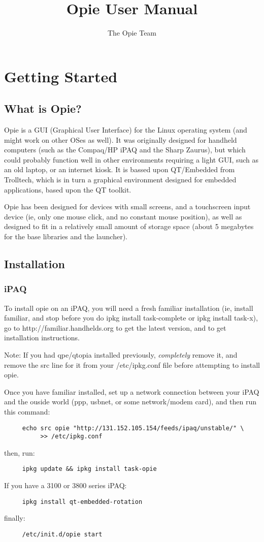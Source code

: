\documentclass[12pt,letterpaper,oneside, openany]{book} \usepackage[latin1] {inputenc}
\title{Opie User Manual}
\author{The Opie Team}
\begin{document}
\maketitle
\tableofcontents
\part{Getting Started}
\chapter{What is Opie?}
Opie is a GUI (Graphical User Interface) for the Linux operating system (and might work on other OSes as well).  It was originally designed for handheld computers (such as the Compaq/HP iPAQ and the Sharp Zaurus), but which could probably function well in other environments requiring a light GUI, such as an old laptop, or an internet kiosk.  It is bassed upon QT/Embedded from Trolltech, which is in turn a graphical environment designed for embedded applications, based upon the QT toolkit.

Opie has been designed for devices with small screens, and a touchscreen input device (ie, only one mouse click, and no constant mouse position), as well as designed to fit in a relatively small amount of storage space (about 5 megabytes for the base libraries and the launcher).
\chapter{Installation}
\section{iPAQ}
To install opie on an iPAQ, you will need a fresh familiar installation (ie, install familiar, and stop before you do ipkg install task-complete or ipkg install task-x), go to http://familiar.handhelds.org to get the latest version, and to get installation instructions.

Note: If you had qpe/qtopia installed previously, \emph{completely} remove it, and remove the src line for it from your /etc/ipkg.conf file before attempting to install opie.

Once you have familiar installed, set up a network connection between your iPAQ and the ouside world (ppp, usbnet, or some network/modem card), and then run this command:
\begin{verbatim}
     echo src opie "http://131.152.105.154/feeds/ipaq/unstable/" \
          >> /etc/ipkg.conf
\end{verbatim} 
then, run:
\begin{verbatim}
     ipkg update && ipkg install task-opie
\end{verbatim}
If you have a 3100 or 3800 series iPAQ:
\begin{verbatim}
     ipkg install qt-embedded-rotation
\end{verbatim}
finally:
\begin{verbatim}
     /etc/init.d/opie start
\end{verbatim}
\end{document}
